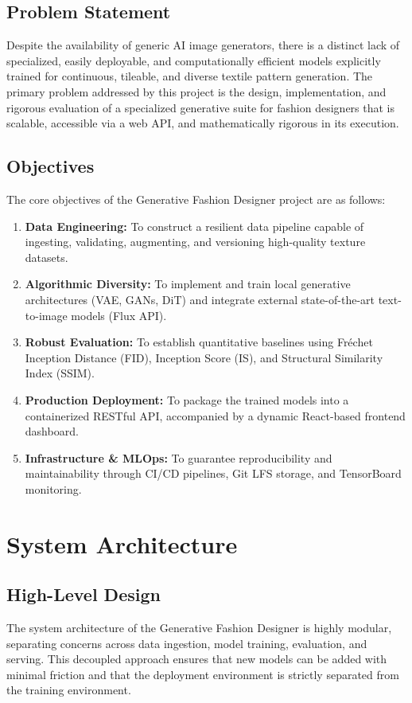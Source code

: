 \documentclass[12pt,a4paper]{article}
\begin{document}
\subsection{Problem Statement}
Despite the availability of generic AI image generators, there is a distinct lack of specialized, easily deployable, and computationally efficient models explicitly trained for continuous, tileable, and diverse textile pattern generation. The primary problem addressed by this project is the design, implementation, and rigorous evaluation of a specialized generative suite for fashion designers that is scalable, accessible via a web API, and mathematically rigorous in its execution.

\subsection{Objectives}
The core objectives of the Generative Fashion Designer project are as follows:
\begin{enumerate}
    \item \textbf{Data Engineering:} To construct a resilient data pipeline capable of ingesting, validating, augmenting, and versioning high-quality texture datasets.
    \item \textbf{Algorithmic Diversity:} To implement and train local generative architectures (VAE, GANs, DiT) and integrate external state-of-the-art text-to-image models (Flux API).
    \item \textbf{Robust Evaluation:} To establish quantitative baselines using Fr\'echet Inception Distance (FID), Inception Score (IS), and Structural Similarity Index (SSIM).
    \item \textbf{Production Deployment:} To package the trained models into a containerized RESTful API, accompanied by a dynamic React-based frontend dashboard.
    \item \textbf{Infrastructure \& MLOps:} To guarantee reproducibility and maintainability through CI/CD pipelines, Git LFS storage, and TensorBoard monitoring.
\end{enumerate}

\section{System Architecture}

\subsection{High-Level Design}
The system architecture of the Generative Fashion Designer is highly modular, separating concerns across data ingestion, model training, evaluation, and serving. This decoupled approach ensures that new models can be added with minimal friction and that the deployment environment is strictly separated from the training environment.
\end{document}
